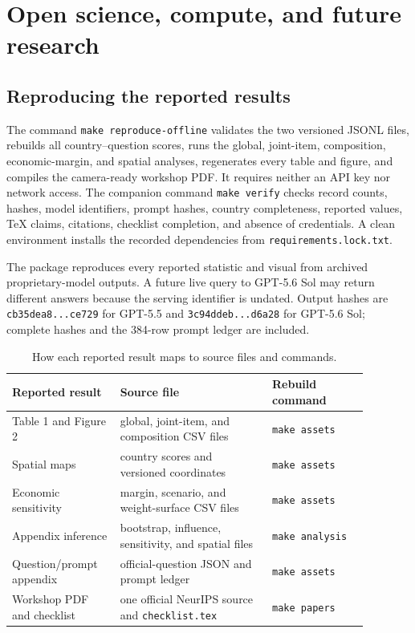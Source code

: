 \section{Open science, compute, and future research}
\label{app:open}

\subsection{Reproducing the reported results}
The command \texttt{make reproduce-offline} validates the two versioned JSONL files,
rebuilds all country--question scores, runs the global, joint-item, composition,
economic-margin, and spatial analyses, regenerates every table and figure, and compiles
the camera-ready workshop PDF. It requires neither an API key nor network access.
The companion command \texttt{make verify} checks record counts, hashes, model
identifiers, prompt hashes, country completeness, reported values, TeX claims, citations,
checklist completion, and absence of credentials. A clean environment installs the
recorded dependencies from \texttt{requirements.lock.txt}.

The package reproduces every reported statistic and visual from archived
proprietary-model outputs. A future live query to GPT-5.6 Sol may return different
answers because the serving identifier is undated. Output hashes are
\texttt{cb35dea8...ce729} for GPT-5.5 and
\texttt{3c94ddeb...d6a28} for GPT-5.6 Sol; complete hashes and the 384-row prompt ledger
are included.

\begin{table}[!htbp]
\centering
\caption{How each reported result maps to source files and commands.}
\small
\begin{tabular}{p{0.26\linewidth}p{0.38\linewidth}p{0.24\linewidth}}
\toprule
\rowcolor{tablehead}
Reported result & Source file & Rebuild command \\
\midrule
Table 1 and Figure 2 & global, joint-item, and composition CSV files & \texttt{make assets} \\
Spatial maps & country scores and versioned coordinates & \texttt{make assets} \\
Economic sensitivity & margin, scenario, and weight-surface CSV files & \texttt{make assets} \\
Appendix inference & bootstrap, influence, sensitivity, and spatial files & \texttt{make analysis} \\
Question/prompt appendix & official-question JSON and prompt ledger & \texttt{make assets} \\
Workshop PDF and checklist & one official NeurIPS source and \texttt{checklist.tex} & \texttt{make papers} \\
\bottomrule
\end{tabular}
\end{table}

